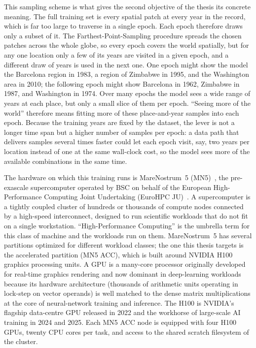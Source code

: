 \documentclass[12pt,a4paper]{article}
\begin{document}
This sampling scheme is what gives the second objective of the thesis its concrete meaning. The
full training set is every spatial patch at every year in the record, which is far too large to
traverse in a single epoch. Each epoch therefore draws only a subset of it. The
Farthest-Point-Sampling procedure spreads the chosen patches across the whole globe, so every
epoch covers the world spatially, but for any one location only a few of its years are visited
in a given epoch, and a different draw of years is used in the next one. One epoch might show
the model the Barcelona region in 1983, a region of Zimbabwe in 1995, and the Washington area in
2010; the following epoch might show Barcelona in 1962, Zimbabwe in 1987, and Washington in
1974. Over many epochs the model sees a wide range of years at each place, but only a small
slice of them per epoch. ``Seeing more of the world'' therefore means fitting more of these
place-and-year samples into each epoch. Because the training years are fixed by the dataset, the
lever is not a longer time span but a higher number of samples per epoch: a data path that
delivers samples several times faster could let each epoch visit, say, two years per location
instead of one at the same wall-clock cost, so the model sees more of the available combinations
in the same time.

The hardware on which this training runs is MareNostrum~5 (MN5)~\cite{mn5}, the pre-exascale
supercomputer operated by BSC on behalf of the European High-Performance Computing Joint
Undertaking (EuroHPC JU)~\cite{eurohpc}. A supercomputer is a tightly coupled cluster of
hundreds or thousands of compute nodes connected by a high-speed interconnect, designed to
run scientific workloads that do not fit on a single workstation. ``High-Performance
Computing'' is the umbrella term for this class of machine and the workloads run on
them. MareNostrum~5 has several partitions optimized for different workload classes; the one
this thesis targets is the accelerated partition (MN5 ACC), which is built around NVIDIA
H100 graphics processing units. A GPU is a many-core processor originally developed
for real-time graphics rendering and now dominant in deep-learning workloads because its
hardware architecture (thousands of arithmetic units operating in lock-step on vector
operands) is well matched to the dense matrix multiplications at the core of neural-network
training and inference. The H100 is NVIDIA's flagship data-centre GPU released in 2022 and
the workhorse of large-scale AI training in 2024 and 2025. Each MN5 ACC node is equipped
with four H100 GPUs, twenty CPU cores per task, and access to the shared scratch filesystem
of the cluster.
\end{document}
